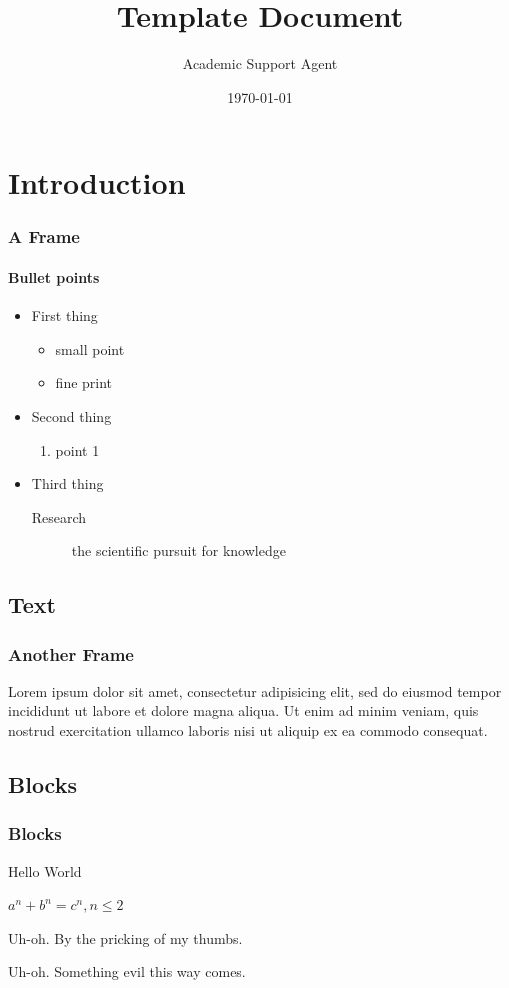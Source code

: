 \documentclass{article}
\title{Template Document}
\author{Academic Support Agent}
\date{\today}
\begin{document}
\maketitle

\begin{frame}[plain,t]
\titlepage
\end{frame}


\section{Introduction}
\begin{frame}
\frametitle{A Frame}
\framesubtitle{Bullet points}
\begin{itemize}
\item First thing
	\begin{itemize}
	\item small point
	\item fine print
	\end{itemize}
\item Second thing
	\begin{enumerate}
	\item point 1
	\end{enumerate}
\item Third thing
	\begin{description}
	\item[Research] the scientific pursuit for knowledge
	\end{description}
\end{itemize}
\end{frame}

\subsection{Text}
\begin{frame}
\frametitle{Another Frame}
Lorem ipsum dolor sit amet, consectetur adipisicing elit, sed do eiusmod tempor incididunt ut labore et dolore magna aliqua. Ut enim ad minim veniam, quis nostrud exercitation ullamco laboris nisi ut aliquip ex ea commodo consequat.
\end{frame}

\subsection{Blocks}
\begin{frame}
\frametitle{Blocks}
\begin{definition}[Greetings]
Hello World
\end{definition}

\begin{theorem}
$a^n + b^n = c^n, n \leq 2$
\end{theorem}

\begin{alertblock}{Uh-oh.}
By the pricking of my thumbs.
\end{alertblock}

\begin{exampleblock}{Uh-oh.}
Something evil this way comes.
\end{exampleblock}

\end{frame}

\ThankYouFrame
\end{document}
